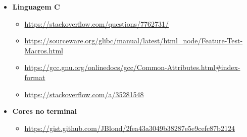 \documentclass[11pt,a4paper]{article}
\begin{document}
{\begin{itemize}[nosep]
    \begin{itemize}[nosep]
        \item \url{https://github.com/lotabout/write-a-C-interpreter/blob/master/tutorial/en/3-Lexer.md}
        \item \url{https://stackoverflow.com/questions/17975913/}
        \item \url{https://github.com/rexim/bnfuzzer}
    \end{itemize}
    \item \textbf{Linguagem C}
    \begin{itemize}[nosep]
        \item \url{https://stackoverflow.com/questions/7762731/}
        \item \url{https://sourceware.org/glibc/manual/latest/html_node/Feature-Test-Macros.html}
        \item \url{https://gcc.gnu.org/onlinedocs/gcc/Common-Attributes.html#index-format}
        \item \url{https://stackoverflow.com/a/35281548}
    \end{itemize}
    \item \textbf{Cores no terminal}
    \begin{itemize}[nosep]
        \item \url{https://gist.github.com/JBlond/2fea43a3049b38287e5e9cefc87b2124}
    \end{itemize}
\end{itemize}
}
\end{document}
